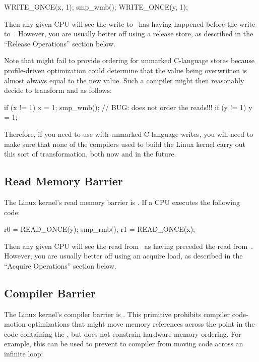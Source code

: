 \begin{VerbatimU}
	WRITE_ONCE(x, 1);
	smp_wmb();
	WRITE_ONCE(y, 1);
\end{VerbatimU}

Then any given CPU will see the write to~ has having happened before
the write to~.  However, you are usually better off using a release
store, as described in the ``Release Operations'' section below.

Note that  might fail to provide ordering for unmarked C-language
stores because profile-driven optimization could determine that the
value being overwritten is almost always equal to the new value.
Such a compiler might then reasonably decide to transform  and
 as follows:

\begin{VerbatimU}
	if (x != 1)
		x = 1;
	smp_wmb(); // BUG: does not order the reads!!!
	if (y != 1)
		y = 1;
\end{VerbatimU}

Therefore, if you need to use  with unmarked C-language writes,
you will need to make sure that none of the compilers used to build
the Linux kernel carry out this sort of transformation, both now and in
the future.


\subsection{Read Memory Barrier}

The Linux kernel's read memory barrier is .
If a CPU executes the following code:

\begin{VerbatimU}
	r0 = READ_ONCE(y);
	smp_rmb();
	r1 = READ_ONCE(x);
\end{VerbatimU}

Then any given CPU will see the read from~ as having preceded the read
from~.
However, you are usually better off using an acquire load, as described
in the ``Acquire Operations'' section below.

\subsection{Compiler Barrier}

The Linux kernel's compiler barrier is .
This primitive prohibits compiler code-motion optimizations that might
move memory references across the point in the code containing the
, but does not constrain hardware memory ordering.
For example, this can be used to prevent to compiler from moving code
across an infinite loop:

